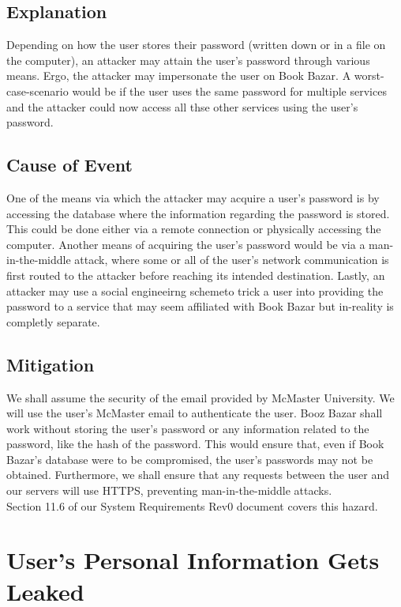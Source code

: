 \documentclass[fullpage]{article}
\begin{document}
\subsection*{Explanation}
Depending on how the user stores their password (written down or in a file on the computer), an attacker may attain the user's password through various means. Ergo, the attacker may impersonate the user on Book Bazar. A worst-case-scenario would be if the user uses the same password for multiple services and the attacker could now access all thse other services using the user's password. 

\subsection*{Cause of Event}
One of the means via which the attacker may acquire a user's password is by accessing the database where the information regarding the password is stored. This could be done either via a remote connection or physically accessing the computer. Another means of acquiring the user's password would be  via a man-in-the-middle attack, where some or all of the user's network communication is first routed to the attacker before reaching its intended destination. Lastly, an attacker may use a social engineeirng schemeto trick a user into providing the password to a service that may seem affiliated with Book Bazar but in-reality is completly separate.

\subsection*{Mitigation}
We shall assume the security of the email provided by McMaster University. We will use the user's McMaster email to authenticate the user. Booz Bazar shall work without storing the user's password or any information related to the password, like the hash of the password. This would ensure that, even if Book Bazar's database were to be compromised, the user's passwords may not be obtained. Furthermore, we shall ensure that any requests between the user and our servers will use HTTPS, preventing man-in-the-middle attacks.\\
\newline
Section 11.6 of our System Requirements Rev0 document covers this hazard.

\section{User's Personal Information Gets Leaked}
\end{document}
